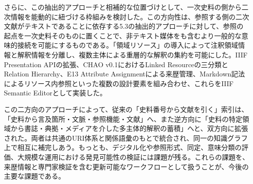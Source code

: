 さらに、この抽出的アプローチと相補的な位置づけとして、一次史料の側から二次情報を能動的に紐づける枠組みを検討した。この方向性は、参照する側の二次文献がテキストであることに依存する5.3の抽出的アプローチに対して、参照の起点を一次史料そのものに置くことで、非テキスト媒体をも含むより一般的な意味的接続を可能にするものである。「領域リソース」の導入によって注釈領域情報と解釈情報を分離し、複数主体による重層的な解釈の集約を可能にした。IIIF Presentation APIの拡張、CHAO v0.1におけるLinked Resourceの三分類とRelation Hierarchy、E13 Attribute Assignmentによる来歴管理、Markdown記法によるリソース内参照といった複数の設計要素を組み合わせ、これらをIIIF Semantic Editorとして実装した。

この二方向のアプローチによって、従来の「史料番号から文献を引く」索引は、「史料から言及箇所・文脈・参照機能・文献」へ、また逆方向に「史料の特定領域から書誌・典拠・メディアを介した多主体的解釈の蓄積」へと、双方向に拡張された。両者は共通のURI体系と関係語彙のもとで統合され、同一の知識グラフ上で相互に補完しあう。もっとも、デジタル化や参照形式、同定、意味分類の評価、大規模な運用における発見可能性の検証には課題が残る。これらの課題を、来歴情報と専門家検証を含む更新可能なワークフローとして扱うことが、今後の主要な課題である。
